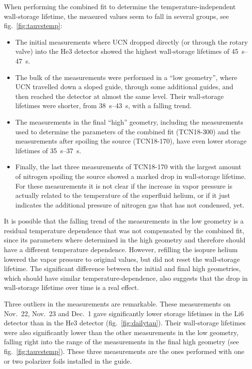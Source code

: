 \documentclass[10pt,letterpaper]{article}
\begin{document}
When performing the combined fit to determine the temperature-independent wall-storage lifetime, the measured values seem to fall in several groups, see fig.~\ref{fig:tauvstemp}:
\begin{itemize}
\item The initial measurements where UCN dropped directly (or through the rotary valve) into the He3 detector showed the highest wall-storage lifetimes of \SIrange{45}{47}{\second}.
\item The bulk of the measurements were performed in a ``low geometry'', where UCN travelled down a sloped guide, through some additional guides, and then reached the detector at almost the same level. Their wall-storage lifetimes were shorter, from \SIrange{38}{43}{\second}, with a falling trend.
\item The measurements in the final ``high'' geometry, including the measurements used to determine the parameters of the combined fit (TCN18-300) and the measurements after spoiling the source (TCN18-170), have even lower storage lifetimes of \SIrange{35}{37}{\second}.
\item Finally, the last three measurements of TCN18-170 with the largest amount of nitrogen spoiling the source showed a marked drop in wall-storage lifetime. For these measurements it is not clear if the increase in vapor pressure is actually related to the temperature of the superfluid helium, or if it just indicates the additional pressure of nitrogen gas that has not condensed, yet.
\end{itemize}

It is possible that the falling trend of the measurements in the low geometry is a residual temperature dependence that was not compensated by the combined fit, since its parameters where determined in the high geometry and therefore should have a different temperature dependence. However, refilling the isopure helium lowered the vapor pressure to original values, but did not reset the wall-storage lifetime. The significant difference between the initial and final high geometries, which should have similar temperature-dependence, also suggests that the drop in wall-storage lifetime over time is a real effect.

Three outliers in the measurements are remarkable. These measurements on Nov.~22, Nov.~23 and Dec.~1 gave significantly lower storage lifetimes in the Li6 detector than in the He3 detector (fig.~\ref{fig:dailytau}). Their wall-storage lifetimes were also significantly lower than the other measurements in the low geometry, falling right into the range of the measurements in the final high geometry (see fig.~\ref{fig:tauvstemp}). These three measurements are the ones performed with one or two polarizer foils installed in the guide.
\end{document}

